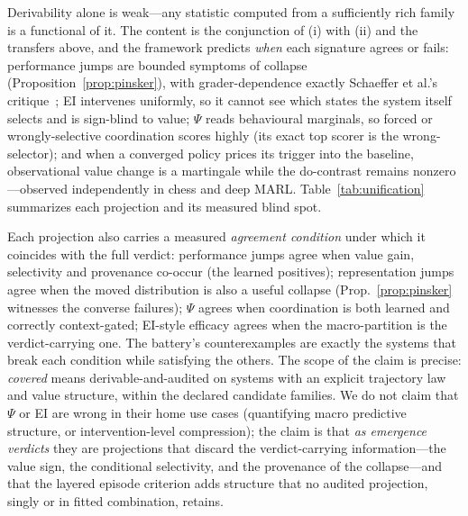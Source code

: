 \documentclass[11pt]{article}
\theoremstyle{definition}
\begin{document}
Derivability alone is weak---any statistic computed from a
sufficiently rich family is a functional of it. The content is the
conjunction of (i) with (ii) and the transfers above, and the
framework predicts \emph{when} each signature agrees or fails:
performance jumps are bounded symptoms of collapse
(Proposition~\ref{prop:pinsker}), with grader-dependence exactly
Schaeffer et al.'s critique~\cite{schaeffer2023}; EI intervenes
uniformly, so it cannot see which states the system itself selects and
is sign-blind to value; $\Psi$ reads behavioural marginals, so forced
or wrongly-selective coordination scores highly (its exact top scorer
is the wrong-selector); and when a converged policy prices its trigger
into the baseline, observational value change is a martingale while
the do-contrast remains nonzero---observed independently in chess and
deep MARL. Table~\ref{tab:unification} summarizes each projection and
its measured blind spot.

Each projection also carries a measured \emph{agreement condition}
under which it coincides with the full verdict: performance jumps
agree when value gain, selectivity and provenance co-occur (the
learned positives); representation jumps agree when the moved
distribution is also a useful collapse (Prop.~\ref{prop:pinsker}
witnesses the converse failures); $\Psi$ agrees when coordination is
both learned and correctly context-gated; EI-style efficacy agrees
when the macro-partition is the verdict-carrying one. The battery's
counterexamples are exactly the systems that break each condition
while satisfying the others.
The scope of the claim is precise: \emph{covered} means
derivable-and-audited on systems with an explicit trajectory law and
value structure, within the declared candidate families. We do not
claim that $\Psi$ or EI are wrong in their home use cases (quantifying
macro predictive structure, or intervention-level compression); the
claim is that \emph{as emergence verdicts} they are projections that
discard the verdict-carrying information---the value sign, the
conditional selectivity, and the provenance of the collapse---and that
the layered episode criterion adds structure that no audited
projection, singly or in fitted combination, retains.
\end{document}
